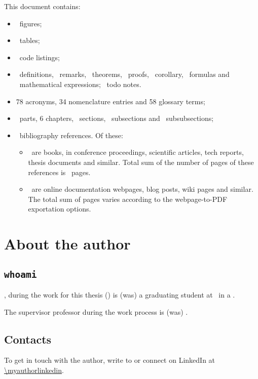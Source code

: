 This document contains:
 \begin{itemize}[noitemsep]
	\item \totalfigures\ figures;
	\item \totaltables\ tables;
	\item \totallstlistings\ code listings;
	\item \totaldefinitions\ definitions,
		  \totalremarks\ remarks,
		  \totaltheorems\ theorems,
		  \totalproofs\ proofs,
		  \totalcorollarys\ corollary,
		  \totalformulas\ formulas and
		  \totalequations\ mathematical expressions;
		  \totaltodos\ todo notes.
	\item 78 acronyms,
		  34 nomenclature entries and
		  58 glossary terms;
	\item \totalparts\ parts,
		  6 chapters,
		  \totalsections\ sections,
		  \totalsubsections\ subsections and
		  \totalsubsubsections\ subsubsections;
	\item \thetotalbibentries\ bibliography references. Of these:
		 \begin{itemize}[noitemsep]
			\item \the\thetotalbibentriesnononline\ are books, in conference proceedings, scientific articles, tech reports, thesis documents and similar.
			Total sum of the number of pages of these references is \the\thetotalbibentriessumpagetotal\ pages.
			\item \the\thetotalbibentriesonline\ are online documentation webpages, blog posts, wiki pages and similar.
			The total sum of pages varies according to the webpage-to-PDF exportation options.
		\end{itemize}
\end{itemize}

\section{About the author} \label{section:Preface/Abouttheauthor}
\subsection[whoami]{\texttt{whoami}} \label{subsection:Preface/Abouttheauthor/WhoamI}
\myauthor, during the work for this thesis (\myyearofpublishing) is (was) a graduating student at \myinstitution\ in a \mycourse.

The supervisor professor during the work process is (was) \mysupervisor. %

\subsection{Contacts} \label{subsection:Preface/Abouttheauthor/Getintouch}
To get in touch with the author, write to \hyperlink{mailto:\myauthoremail}{\texttt{\myauthoremail}} or connect on \gls{LinkedIn} at \url{\myauthorlinkedin}.

\newpage
\thispagestyle{empty}
